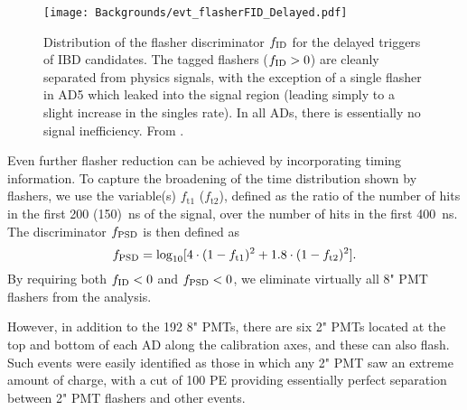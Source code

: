 \documentclass[../thesis.tex]{subfiles}
\begin{document}
\begin{figure}[h]
  \texttt{[image: Backgrounds/evt\_flasherFID\_Delayed.pdf]}
  \caption{Distribution of the flasher discriminator $f_{\mathrm{ID}}$ for the delayed triggers of IBD candidates. The tagged flashers ($f_{\mathrm{ID}} > 0$) are cleanly separated from physics signals, with the exception of a single flasher in AD5 which leaked into the signal region (leading simply to a slight increase in the singles rate). In all ADs, there is essentially no signal inefficiency. From \cite{An_2017}.}
  \label{fig:fID_dist}
\end{figure}

Even further flasher reduction can be achieved by incorporating timing information. To capture the broadening of the time distribution shown by flashers, we use the variable(s) $f_{\mathrm{t}1}$ ($f_{\mathrm{t}2}$), defined as the ratio of the number of hits in the first 200 (150)~ns of the signal, over the number of hits in the first 400~ns. The discriminator $f_{\mathrm{PSD}}$ is then defined as
\begin{equation}
  f_{\mathrm{PSD}} = \log_{10} [4 \cdot (1 - f_{\mathrm{t}1})^2 + 1.8 \cdot (1 - f_{\mathrm{t}2})^2].
\end{equation}
By requiring both $f_{\mathrm{ID}} < 0$ and $f_{\mathrm{PSD}} < 0$, we eliminate virtually all 8" PMT flashers from the analysis.

However, in addition to the 192 8" PMTs, there are six 2" PMTs located at the top and bottom of each AD along the calibration axes, and these can also flash. Such events were easily identified as those in which any 2" PMT saw an extreme amount of charge, with a cut of 100 PE providing essentially perfect separation between 2" PMT flashers and other events.
\end{document}

